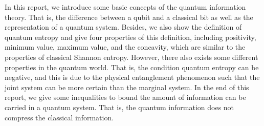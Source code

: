 In this report, we introduce some basic concepts of the quantum information theory.
That is, the difference between a qubit and a classical bit as well as the representation of a quantum system.
Besides, we also show the definition of quantum entropy and give four properties of this definition, including positivity, minimum value, maximum value, and the concavity, which are similar to the properties of classical Shannon entropy.
However, there also exists some different properties in the quantum world.
That is, the condition quantum entropy can be negative, and this is due to the physical entanglement phenomenon such that the joint system can be more certain than the marginal system.
In the end of this report, we give some inequalities to bound the amount of information can be carried in a quantum system.
That is, the quantum information does not compress the classical information.  